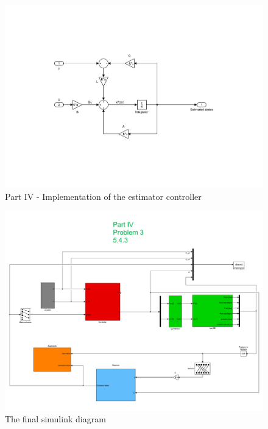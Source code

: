 \begin{figure}[htb]
	\centering
		\includegraphics[width=\textwidth]{models/P4_estimator_control.pdf}
	\caption{Part IV - Implementation of the estimator controller}
\label{fig:P4_observer}
\end{figure}
\begin{figure}[htb]
	\centering
		\includegraphics[width=\textwidth]{models/All_test.pdf}
	\caption{The final simulink diagram}
\label{fig:final_simulink}
\end{figure}